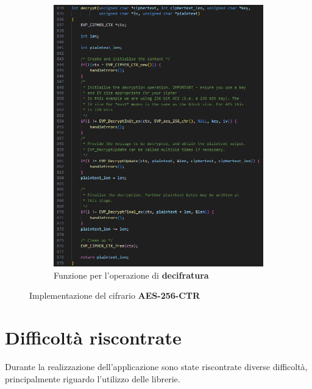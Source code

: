 \begin{figure}[h]
\begin{subfigure}{0.49\textwidth}
        \includegraphics[width=1\textwidth]{capitoli/figure-implementazione/aes-decrypt.png}
        \caption{Funzione per l'operazione di \textbf{decifratura}}
        \label{fig:aes-decrypt}
    \end{subfigure}
    \caption{Implementazione del cifrario \textbf{AES-256-CTR}}
    \label{fig:aes-functions}
\end{figure}

\section{Difficoltà riscontrate}
Durante la realizzazione dell'applicazione sono state riscontrate diverse difficoltà, principalmente riguardo l'utilizzo delle librerie.
